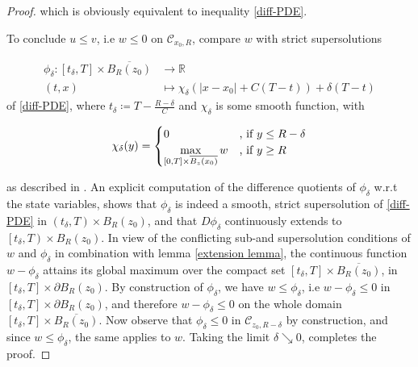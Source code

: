 \begin{theorem}
\begin{proof}
				which is obviously equivalent to inequality \ref{diff-PDE}.
				
				To conclude $ u \leq v $, i.e $ w \leq 0 $ on $ \mathcal{C}_{x_0, R} $, compare $ w $ with strict supersolutions 
				
				\begin{align*}
				\phi_{\delta} : \left[ t_{\delta}, T \right] \times \overline{B_R(z_0)} &\to \mathbb{R} \\
				(t, x) &\mapsto \chi_{\delta} \left( \lvert x - x_0 \rvert + C(T - t) \right) + \delta (T - t)
				\end{align*}
				of \ref{diff-PDE}, where $ t_{\delta} \coloneqq T - \frac{R - \delta}{C} $ and $ \chi_{\delta} $ is some smooth function, with
				
				\begin{align*}
					\chi_{\delta}(y) = \begin{cases}
					0 &\hbox{, if } y \leq R - \delta \\
					\max\limits_{\left[0, T\right] \times \overline{B_z(x_0)}} w &\hbox{, if }y \geq R
					\end{cases}
				\end{align*}
				
				as described in \cite[p.~73]{barles}. An explicit computation of the difference quotients of $ \phi_{\delta} $ w.r.t the state variables, shows that $ \phi_{\delta} $ is indeed a smooth, strict supersolution of \ref{diff-PDE} in $ \left(t_{\delta}, T \right) \times B_R(z_0) $, and that $ D \phi_{\delta} $ continuously extends to $ \left[t_{\delta}, T \right) \times B_R(z_0) $. In view of the conflicting sub-and supersolution conditions of $ w $ and $ \phi_{\delta} $ in combination with lemma \ref{extension lemma}, the continuous function $ w - \phi_{\delta} $ attains its global maximum over the compact set $ \left[t_{\delta}, T \right] \times \overline{B_R(z_0)} $, in $ \left[t_{\delta}, T \right] \times \partial B_R(z_0) $. By construction of $ \phi_{\delta} $, we have $ w \leq \phi_{\delta} $, i.e $ w - \phi_{\delta} \leq 0 $ in $ \left[t_{\delta}, T \right] \times \partial B_R(z_0) $, and therefore $ w - \phi_{\delta} \leq 0 $ on the whole domain $ \left[ t_{\delta}, T \right] \times \overline{B_R(z_0)} $.
				Now observe that $ \phi_{\delta} \leq 0 $ in $ \mathcal{C}_{z_0, R - \delta} $ by construction, and since $ w \leq \phi_{\delta} $, the same applies to $ w $. Taking the limit $ \delta \searrow 0 $, completes the proof.
			\end{proof}
		\end{theorem}